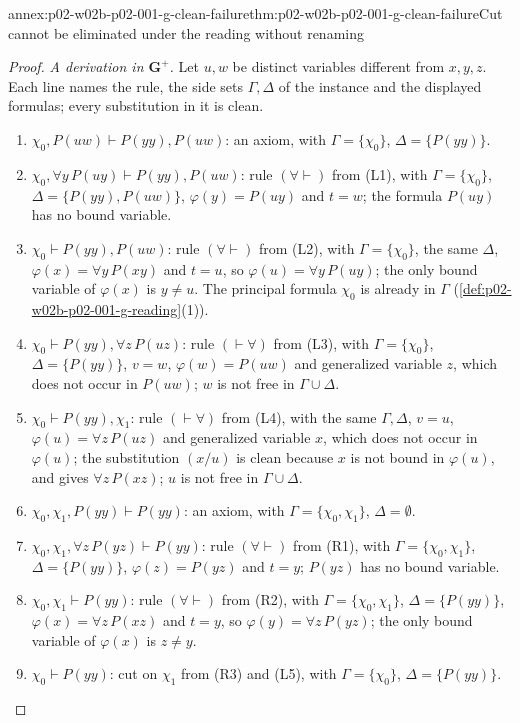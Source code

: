\begin{annexitem}{annex:p02-w02b-p02-001-g-clean-failure}{thm:p02-w02b-p02-001-g-clean-failure}{Cut cannot be eliminated under the reading without renaming}
\begin{proof}
\emph{A derivation in \(\mathbf G^{+}\).}  Let \(u,w\) be distinct
variables different from \(x,y,z\).  Each line names the rule, the side
sets \(\Gamma,\Delta\) of the instance and the displayed formulas; every
substitution in it is clean.
\begin{enumerate}
\item[(L1)] \(\chi_0,P(uw)\vdash P(yy),P(uw)\): an axiom, with
      \(\Gamma=\{\chi_0\}\), \(\Delta=\{P(yy)\}\).
\item[(L2)] \(\chi_0,\forall y\,P(uy)\vdash P(yy),P(uw)\): rule
      \((\forall\vdash)\) from (L1), with \(\Gamma=\{\chi_0\}\),
      \(\Delta=\{P(yy),P(uw)\}\), \(\varphi(y)=P(uy)\) and \(t=w\); the
      formula \(P(uy)\) has no bound variable.
\item[(L3)] \(\chi_0\vdash P(yy),P(uw)\): rule \((\forall\vdash)\) from
      (L2), with \(\Gamma=\{\chi_0\}\), the same \(\Delta\),
      \(\varphi(x)=\forall y\,P(xy)\) and \(t=u\), so
      \(\varphi(u)=\forall y\,P(uy)\); the only bound variable of
      \(\varphi(x)\) is \(y\neq u\).  The principal formula \(\chi_0\) is
      already in \(\Gamma\) (\cref{def:p02-w02b-p02-001-g-reading}(1)).
\item[(L4)] \(\chi_0\vdash P(yy),\forall z\,P(uz)\): rule \((\vdash\forall)\)
      from (L3), with \(\Gamma=\{\chi_0\}\), \(\Delta=\{P(yy)\}\), \(v=w\),
      \(\varphi(w)=P(uw)\) and generalized variable \(z\), which does not
      occur in \(P(uw)\); \(w\) is not free in \(\Gamma\cup\Delta\).
\item[(L5)] \(\chi_0\vdash P(yy),\chi_1\): rule \((\vdash\forall)\) from
      (L4), with the same \(\Gamma,\Delta\), \(v=u\),
      \(\varphi(u)=\forall z\,P(uz)\) and generalized variable \(x\), which
      does not occur in \(\varphi(u)\); the substitution \((x/u)\) is clean
      because \(x\) is not bound in \(\varphi(u)\), and gives
      \(\forall z\,P(xz)\); \(u\) is not free in \(\Gamma\cup\Delta\).
\item[(R1)] \(\chi_0,\chi_1,P(yy)\vdash P(yy)\): an axiom, with
      \(\Gamma=\{\chi_0,\chi_1\}\), \(\Delta=\emptyset\).
\item[(R2)] \(\chi_0,\chi_1,\forall z\,P(yz)\vdash P(yy)\): rule
      \((\forall\vdash)\) from (R1), with \(\Gamma=\{\chi_0,\chi_1\}\),
      \(\Delta=\{P(yy)\}\), \(\varphi(z)=P(yz)\) and \(t=y\); \(P(yz)\) has
      no bound variable.
\item[(R3)] \(\chi_0,\chi_1\vdash P(yy)\): rule \((\forall\vdash)\) from
      (R2), with \(\Gamma=\{\chi_0,\chi_1\}\), \(\Delta=\{P(yy)\}\),
      \(\varphi(x)=\forall z\,P(xz)\) and \(t=y\), so
      \(\varphi(y)=\forall z\,P(yz)\); the only bound variable of
      \(\varphi(x)\) is \(z\neq y\).
\item[(C)] \(\chi_0\vdash P(yy)\): cut on \(\chi_1\) from (R3) and (L5),
      with \(\Gamma=\{\chi_0\}\), \(\Delta=\{P(yy)\}\).
\end{enumerate}


\end{proof}
\end{annexitem}
